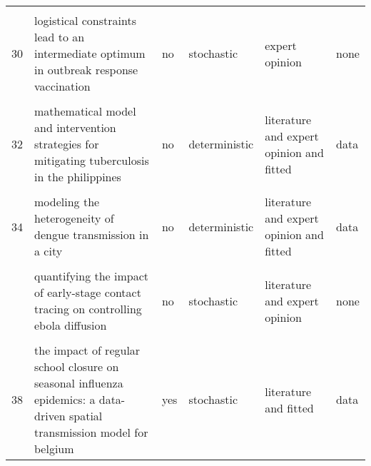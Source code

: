\documentclass[
]{article}
\begin{document}
\begin{landscape}
\begin{longtable}{l>{\raggedright\arraybackslash}p{3cm}l>{\raggedright\arraybackslash}p{3cm}ll}
\cellcolor{gray!6}{29} & \cellcolor{gray!6}{initial validation of a simulation model for estimating the impact of serogroup a neisseria meningitidis vaccination in the african meningitis belt} & \cellcolor{gray!6}{no} & \cellcolor{gray!6}{stochastic} & \cellcolor{gray!6}{literature and fitted} & \cellcolor{gray!6}{data}\\
30 & logistical constraints lead to an intermediate optimum in outbreak response vaccination & no & stochastic & expert opinion & none\\
\addlinespace
\cellcolor{gray!6}{31} & \cellcolor{gray!6}{manipulation of contact network structure and the impact on foot-and-mouth disease transmission} & \cellcolor{gray!6}{yes} & \cellcolor{gray!6}{stochastic} & \cellcolor{gray!6}{literature and expert opinion} & \cellcolor{gray!6}{none}\\
32 & mathematical model and intervention strategies for mitigating tuberculosis in the philippines & no & deterministic & literature and expert opinion and fitted & data\\
\cellcolor{gray!6}{33} & \cellcolor{gray!6}{measles outbreak response decision-making under uncertainty: a retrospective analysis} & \cellcolor{gray!6}{no} & \cellcolor{gray!6}{stochastic} & \cellcolor{gray!6}{literature and expert opinion and fitted} & \cellcolor{gray!6}{data}\\
34 & modeling the heterogeneity of dengue transmission in a city & no & deterministic & literature and expert opinion and fitted & data\\
\cellcolor{gray!6}{35} & \cellcolor{gray!6}{modelling the large-scale yellow fever outbreak in luanda, angola, and the impact of vaccination} & \cellcolor{gray!6}{no} & \cellcolor{gray!6}{deterministic} & \cellcolor{gray!6}{expert opinion and fitted} & \cellcolor{gray!6}{none}\\
\addlinespace
36 & quantifying the impact of early-stage contact tracing on controlling ebola diffusion & no & stochastic & literature and expert opinion & none\\
\cellcolor{gray!6}{37} & \cellcolor{gray!6}{simulation of key interventions for seasonal influenza outbreak control at school in changsha, china} & \cellcolor{gray!6}{no} & \cellcolor{gray!6}{deterministic} & \cellcolor{gray!6}{literature and fitted} & \cellcolor{gray!6}{data}\\
38 & the impact of regular school closure on seasonal influenza epidemics: a data-driven spatial transmission model for belgium & yes & stochastic & literature and fitted & data\\

\end{longtable}
\end{landscape}
\end{document}
